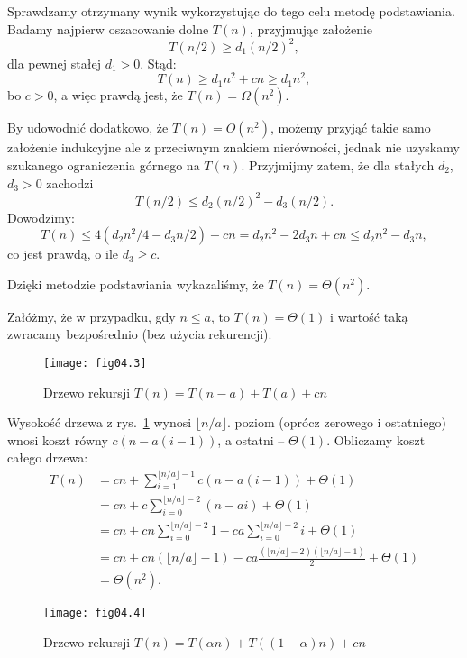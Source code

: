 Sprawdzamy otrzymany wynik wykorzystując do tego celu metodę podstawiania. Badamy najpierw oszacowanie dolne $T(n)$, przyjmując założenie
\[
	T(n/2) \ge d_1(n/2)^2,
\]
dla pewnej stałej $d_1>0$. Stąd:
\[
	T(n) \ge d_1n^2+cn \ge d_1n^2, 
\]
bo $c>0$, a więc prawdą jest, że $T(n)=\Omega(n^2)$.

By udowodnić dodatkowo, że $T(n)=O(n^2)$, możemy przyjąć takie samo założenie indukcyjne ale z przeciwnym znakiem nierówności, jednak nie uzyskamy szukanego ograniczenia górnego na $T(n)$. Przyjmijmy zatem, że dla stałych $d_2$,~$d_3>0$ zachodzi
\[
	T(n/2) \le d_2(n/2)^2-d_3(n/2).
\]
Dowodzimy:
\[
	T(n) \le 4(d_2n^2\!/4-d_3n/2)+cn = d_2n^2-2d_3n+cn \le d_2n^2-d_3n,
\]
co jest prawdą, o ile $d_3\ge c$.

Dzięki metodzie podstawiania wykazaliśmy, że $T(n)=\Theta(n^2)$.

\exercise %
Załóżmy, że w przypadku, gdy $n\le a$, to $T(n)=\Theta(1)$ i wartość taką zwracamy bezpośrednio (bez użycia rekurencji).
\begin{figure}[ht]
	\begin{center}
		\texttt{[image: fig04.3]}
	\end{center}
	\caption{Drzewo rekursji $T(n)=T(n-a)+T(a)+cn$} \label{fig:4.2-4}
\end{figure}
Wysokość drzewa z rys.~\ref{fig:4.2-4} wynosi $\lfloor n/a\rfloor$.  poziom (oprócz zerowego i ostatniego) wnosi koszt równy $c(n-a(i-1))$, a ostatni -- $\Theta(1)$. Obliczamy koszt całego drzewa:
\begin{align*}
	T(n) &= cn+\sum_{i=1}^{\lfloor n/a\rfloor-1}c(n-a(i-1))+\Theta(1) \\
	&= cn+c\sum_{i=0}^{\lfloor n/a\rfloor-2}(n-ai)+\Theta(1) \\
	&= cn+cn\sum_{i=0}^{\lfloor n/a\rfloor-2}1-ca\sum_{i=0}^{\lfloor n/a\rfloor-2}i+\Theta(1) \\
	&= cn+cn(\lfloor n/a\rfloor-1)-ca\frac{(\lfloor n/a\rfloor-2)(\lfloor n/a\rfloor-1)}{2}+\Theta(1) \\[2mm]
	&= \Theta(n^2).
\end{align*}

\exercise %
\begin{figure}[ht]
	\begin{center}
		\texttt{[image: fig04.4]}
	\end{center}
	\caption{Drzewo rekursji $T(n)=T(\alpha n)+T((1-\alpha)n)+cn$} \label{fig:4.2-5}
\end{figure}

